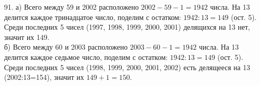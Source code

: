 91. а) Всего между 59 и 2002 расположено $2002-59-1=1942$ числа. На 13 делится каждое тринадцатое число, поделим с остатком: $1942:13=149$ (ост. 5). Среди последних 5 чисел (1997, 1998, 1999, 2000, 2001) делящихся на 13 нет, значит их 149.\\
б) Всего между 60 и 2003 расположено $2003-60-1=1942$ числа. На 13 делится каждое седьмое число, поделим с остатком: $1942:13=149$ (ост. 5). Среди последних 5 чисел (1998, 1999, 2000, 2001, 2002) есть делящееся на 13 (2002:13=154), значит их $149+1=150.$\\

